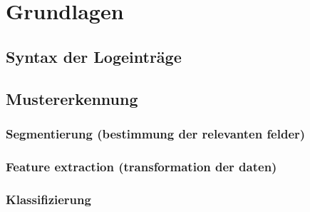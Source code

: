 \section{Grundlagen}

\subsection{Syntax der Logeinträge}
\label{sub:Aufbau der Logeinträge}

\subsection{Mustererkennung}
\label{sub:Mustererkennung}

\subsubsection{Segmentierung (bestimmung der relevanten felder)}
\label{ssub:Segmentierung}

\subsubsection{Feature extraction (transformation der daten)}
\label{ssub:Feature extraction}

\subsubsection{Klassifizierung}
\label{ssub:Klassifizierung}


